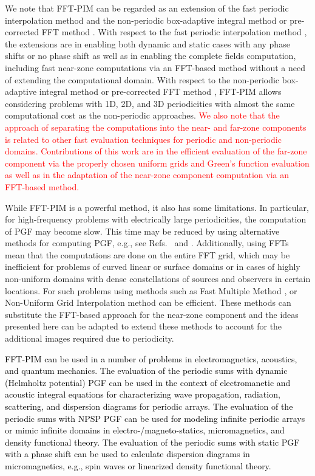 \documentclass{article}
\begin{document}
We note that FFT-PIM can be regarded as an extension of the fast periodic interpolation method \cite{5582244} and the non-periodic box-adaptive integral method \cite{6348120} or pre-corrected FFT method \cite{662670}. With respect to the fast periodic interpolation method \cite{5582244}, the extensions are in enabling both dynamic and static cases with any phase shifts or no phase shift as well as in enabling the complete fields computation, including fast near-zone computations via an FFT-based method without a need of extending the computational domain. With respect to the non-periodic box-adaptive integral method \cite{6348120} or pre-corrected FFT method \cite{662670}, FFT-PIM allows considering problems with 1D, 2D, and 3D periodicities with almost the same computational cost as the non-periodic approaches. \textcolor{red}{We also note that the approach of separating the computations into the near- and far-zone components is related to other fast evaluation techniques \cite{662670, r1_1, r1_2, r1_3, r1_4, 5582244, 6348120} for periodic and non-periodic domains. Contributions of this work are in the efficient evaluation of the far-zone component via the properly chosen uniform grids and Green's function evaluation as well as in the adaptation of the near-zone component computation via an FFT-based method.}

While FFT-PIM is a powerful method, it also has some limitations. In particular, for high-frequency problems with electrically large periodicities, the computation of PGF may become slow. This time may be reduced by using alternative methods for computing PGF, e.g., see Refs.~\cite{6059491} and \cite{4907048}. Additionally, using FFTs mean that the computations are done on the entire FFT grid, which may be inefficient for problems of curved linear or surface domains or in cases of highly non-uniform domains with dense constellations of sources and observers in certain locations. For such problems using methods such as Fast Multiple Method \cite{GREENGARD1987325}, \cite{558669} or Non-Uniform Grid Interpolation method \cite{LI20108463} can be efficient. These methods can substitute the FFT-based approach for the near-zone component and the ideas presented here can be adapted to extend these methods to account for the additional images required due to periodicity.

\textcolor{black}{FFT-PIM can be used in a number of problems in electromagnetics, acoustics, and quantum mechanics. The evaluation of the periodic sums with dynamic (Helmholtz potential) PGF can be used in the context of electromanetic and acoustic integral equations for characterizing wave propagation, radiation, scattering, and dispersion diagrams for periodic arrays. The evaluation of the periodic sums with \textcolor{black}{NPSP} PGF can be used for modeling infinite periodic arrays or mimic infinite domains in electro-/magneto-statics, micromagnetics, and density functional theory. The evaluation of the periodic sums with static PGF with a phase shift can be used to calculate dispersion diagrams in micromagnetics, e.g., spin waves or linearized density functional theory.}   
\end{document}
